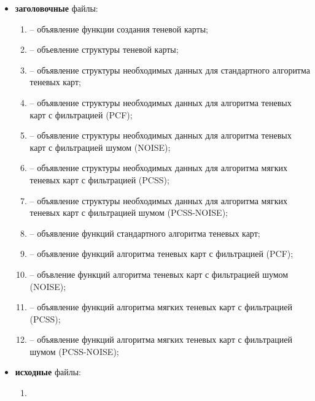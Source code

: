 \begin{itemize}[label=---]
    \item \textbf{заголовочные} файлы:
    \begin{enumerate}[label=\arabic*), labelsep=0.5em]
        \item {} -- объявление функции создания теневой карты;
        \item {} -- объевление структуры теневой карты;
        \item {} -- объявление структуры необходимых данных для
        стандартного алгоритма теневых карт;
        \item {} -- объявление структуры необходимых данных для
        алгоритма теневых карт с фильтрацией (PCF);
        \item {} -- объявление структуры необходимых данных для
        алгоритма теневых карт с фильтрацией шумом (NOISE);
        \item {} -- объявление структуры необходимых данных для
        алгоритма мягких теневых карт с фильтрацией (PCSS);
        \item {} -- объявление структуры необходимых данных для
        алгоритма мягких теневых карт с фильтрацией шумом (PCSS-NOISE);
        \item {} -- объявление функций стандартного алгоритма теневых карт;
        \item {} -- объявление функций алгоритма теневых карт с фильтрацией (PCF);
        \item {} -- объвление функций алгоритма теневых карт с фильтрацией шумом (NOISE);
        \item {} -- объявление функций алгоритма мягких теневых карт с фильтрацией (PCSS);
        \item {} -- объявление функций алгоритма мягких теневых карт с фильтрацией шумом (PCSS-NOISE);
    \end{enumerate}
    \item \textbf{исходные} файлы:
    \begin{enumerate}[label=\arabic*), labelsep=0.5em]
        \item 
    \end{enumerate}
\end{itemize}

